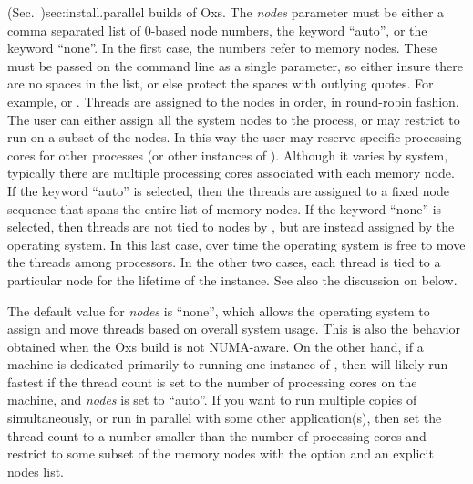 \begin{description}
{  (Sec.~}{)}{sec:install.parallel} builds of Oxs.  The \textit{nodes}
  parameter must be either a comma separated list of 0-based node
  numbers, the keyword ``auto'', or the keyword ``none''.  In the first
  case, the numbers refer to memory nodes.  These must be passed on the
  command line as a single parameter, so either insure there are no
  spaces in the list, or else protect the spaces with outlying quotes.
  For example,  or .
  Threads are assigned to the nodes in order, in round-robin fashion.
  The user can either assign all the system nodes to the 
  process, or may restrict  to run on a subset of the nodes.
  In this way the user may reserve specific processing cores for other
  processes (or other instances of ).  Although it varies by
  system, typically there are multiple processing cores associated with
  each memory node.  If the keyword ``auto'' is selected, then the
  threads are assigned to a fixed node sequence that spans the entire
  list of memory nodes.  If the keyword ``none'' is selected, then
  threads are not tied to nodes by , but are instead assigned
  by the operating system.  In this last case, over time the operating
  system is free to move the threads among processors.  In the other two
  cases, each thread is tied to a particular node for the lifetime of
  the  instance.  See also the discussion
  on  below.

  The default value for \textit{nodes} is ``none'', which allows the
  operating system to assign and move threads based on overall system
  usage.  This is also the behavior obtained when the Oxs build is not
  NUMA-aware.  On the other hand, if a machine is dedicated primarily
  to running one instance of , then  will
  likely run fastest if the thread count is set to the number of
  processing cores on the machine, and \textit{nodes} is set to
  ``auto''.  If you want to run multiple copies of 
  simultaneously, or run  in parallel with some other
  application(s), then set the thread count to a number smaller than
  the number of processing cores and restrict  to some
  subset of the memory nodes with the  option and an
  explicit nodes list.


\end{description}
